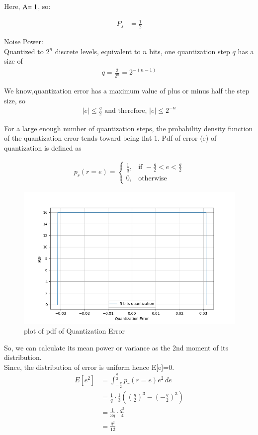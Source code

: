\documentclass[journal,12pt,onecolumn]{IEEEtran}
\begin{document}
Here, \($A$ = 1\), so:

\begin{align}
P_s &= \frac{1}{2}
\end{align}
\item Noise Power:\\
Quantized to $2^n$ discrete levels, equivalent to $n$ bits, one quantization step $q$ has a size of
\begin{align}
q = \frac{2}{2^{n}} = 2^{-(n-1)}
\end{align}

We know,quantization error has a maximum value of plus or minus half the
step size, so 
\begin{align}
\left| e \right| \leq \frac{q}{2} \text{ and therefore, } \left| e \right| \leq 2^{-n}
\end{align}

For a large enough number of quantization steps, the probability density function of the quantization error tends toward being flat 1.
Pdf of error (e) of quantization is defined as 

\begin{align}
p_r(r=e) = 
\begin{cases}
    \frac{1}{q}, & \text{if } -\frac{q}{2} < e < \frac{q}{2} \\
    0, & \text{otherwise}
\end{cases}
\end{align}
\begin{figure}[H]
  \centering
  \includegraphics[width=1\columnwidth]{Graph/b.png}
  \caption{plot of pdf of Quantization Error}
  \label{fig:Gate.31.2023.2}
\end{figure}

So, we can calculate its mean power or variance as the 2nd moment of its distribution.\\
Since, the distribution of error is uniform hence E[e]=0.
\begin{align}
E[e^{2}] &= \int_{-\frac{q}{2}}^{\frac{q}{2}} p_r(r=e) e^{2} \, de \\
&= \frac{1}{q} \cdot \frac{1}{3} \left(\left(\frac{q}{2}\right)^{3} - \left(-\frac{q}{2}\right)^{3}\right)\\
&=\frac{1}{3q} \cdot \frac{q^{3}}{4}\\
&=\frac{q^{2}}{12}\\
\end{align}
\end{document}
